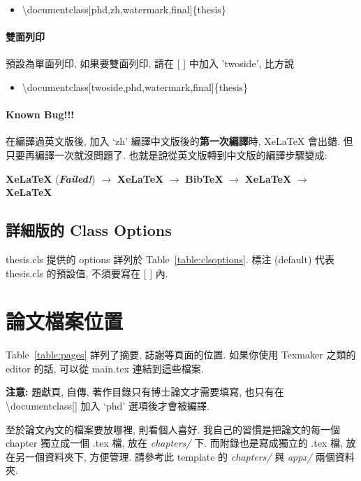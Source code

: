 \begin{itemize}
\item \textbackslash documentclass[phd,zh,watermark,final]\{thesis\}
\end{itemize}

\paragraph{雙面列印} 預設為單面列印, 如果要雙面列印, 請在 [ ] 中加入 'twoside', 比方說

\begin{itemize}
\item \textbackslash documentclass[twoside,phd,watermark,final]\{thesis\}
\end{itemize}

\paragraph{Known Bug!!!} 在編譯過英文版後, 加入 `zh' 編譯中文版後的\textbf{第一次編譯}時, XeLaTeX 會出錯.
但只要再編譯一次就沒問題了.
也就是說從英文版轉到中文版的編譯步驟變成:

\hspace{2em} \textbf{XeLaTeX} (\textbf{\textit{Failed!}}) $\rightarrow$ \textbf{XeLaTeX} $\rightarrow$ \textbf{BibTeX} $\rightarrow$ \textbf{XeLaTeX} $\rightarrow$ \textbf{XeLaTeX}

\subsection{詳細版的 Class Options}

thesis.cls 提供的 options 詳列於 Table~\ref{table:clsoptions}.
標注 (default) 代表 thesis.cls 的預設值, 不須要寫在 [ ] 內.



\section{論文檔案位置}

Table~\ref{table:pages} 詳列了摘要, 誌謝等頁面的位置.
如果你使用 Texmaker 之類的 editor 的話, 可以從 main.tex 連結到這些檔案.

\textbf{注意:} 題獻頁, 自傳, 著作目錄只有博士論文才需要填寫, 也只有在 \textbackslash documentclass[] 加入 `phd' 選項後才會被編譯.



至於論文內文的檔案要放哪裡, 則看個人喜好.
我自己的習慣是把論文的每一個 chapter 獨立成一個 .tex 檔, 放在 \textit{chapters/} 下.
而附錄也是寫成獨立的 .tex 檔, 放在另一個資料夾下, 方便管理.
請參考此 template 的 \textit{chapters/} 與 \textit{appx/} 兩個資料夾.
